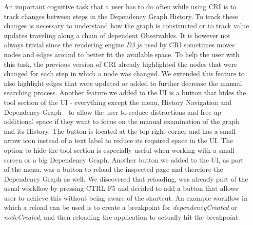 An important cognitive task that a user has to do often while using CRI is to track changes between steps in the Dependency Graph History. To track these changes is necessary to understand how the graph is constructed or to track value updates traveling along a chain of dependent Observables. It is however not always trivial since the rendering engine \emph{D3.js} \cite{D3JS} used by CRI sometimes moves nodes and edges around to better fit the available space. To help the user with this task, the previous version of CRI already highlighted the nodes that were changed for each step in which a node was changed. We extended this feature to also highlight edges that were updated or added to further decrease the manual searching process. Another feature we added to the UI is a button that hides the tool section of the UI - everything except the menu, History Navigation and Dependency Graph - to allow the user to reduce distractions and free up additional space if they want to focus on the manual examination of the graph and its History. The button is located at the top right corner and has a small arrow icon instead of a text label to reduce its required space in the UI. The option to hide the tool section is especially useful when working with a small screen or a big Dependency Graph. Another button we added to the UI, as part of the menu, was a button to reload the inspected page and therefore the Dependency Graph as well. We discovered that reloading, was already part of the usual workflow by pressing CTRL F5 and decided to add a button that allows user to achieve this without being aware of the shortcut. An example workflow in which a reload can be used is to create a breakpoint for \emph{dependencyCreated} or \emph{nodeCreated}, and then reloading the application to actually hit the breakpoint.
